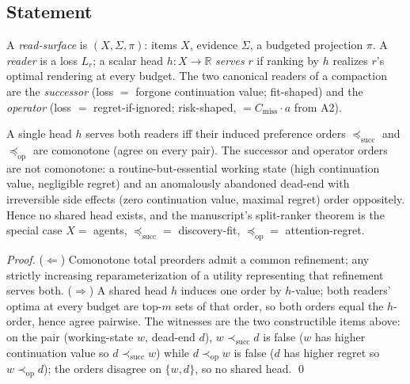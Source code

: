 \documentclass[11pt,a4paper]{article}
\begin{document}
\subsection{Statement}
A \emph{read-surface} is $(X,\Sigma,\pi)$: items $X$, evidence $\Sigma$, a budgeted projection $\pi$. A \emph{reader} is a loss $L_r$; a scalar head $h:X\to\mathbb R$ \emph{serves} $r$ if ranking by $h$ realizes $r$'s optimal rendering at every budget. The two canonical readers of a compaction are the \emph{successor} (loss $=$ forgone continuation value; fit-shaped) and the \emph{operator} (loss $=$ regret-if-ignored; risk-shaped, $=C_\text{miss}\cdot a$ from A2).
\begin{theorem}
A single head $h$ serves both readers iff their induced preference orders $\preceq_\text{succ}$ and $\preceq_\text{op}$ are comonotone (agree on every pair). The successor and operator orders are not comonotone: a routine-but-essential working state (high continuation value, negligible regret) and an anomalously abandoned dead-end with irreversible side effects (zero continuation value, maximal regret) order oppositely. Hence no shared head exists, and the manuscript's split-ranker theorem is the special case $X=$ agents, $\preceq_\text{succ}=$ discovery-fit, $\preceq_\text{op}=$ attention-regret.
\end{theorem}
\begin{proof}
($\Leftarrow$) Comonotone total preorders admit a common refinement; any strictly increasing reparameterization of a utility representing that refinement serves both. ($\Rightarrow$) A shared head $h$ induces one order by $h$-value; both readers' optima at every budget are top-$m$ sets of that order, so both orders equal the $h$-order, hence agree pairwise. The witnesses are the two constructible items above: on the pair (working-state $w$, dead-end $d$), $w\prec_\text{succ}d$ is false ($w$ has higher continuation value so $d\prec_\text{succ}w$) while $d\prec_\text{op}w$ is false ($d$ has higher regret so $w\prec_\text{op}d$); the orders disagree on $\{w,d\}$, so no shared head. \qed
\end{proof}
\end{document}
